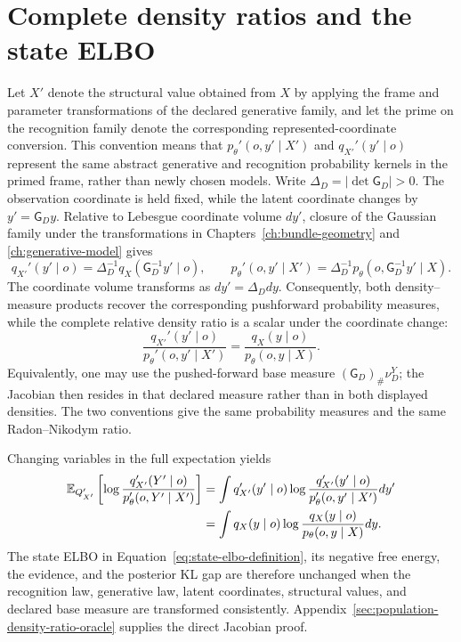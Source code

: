 \section{Complete density ratios and the state ELBO}

Let \(X'\) denote the structural value obtained from \(X\) by applying the frame and parameter transformations of the declared generative family, and let the prime on the recognition family denote the corresponding represented-coordinate conversion. This convention means that \(p_\theta'(o,y'\mid X')\) and \(q_{X'}'(y'\mid o)\) represent the same abstract generative and recognition probability kernels in the primed frame, rather than newly chosen models. Write \(\Delta_D=|\det\mathsf G_D|>0\). The observation coordinate is held fixed, while the latent coordinate changes by \(y'=\mathsf G_Dy\). Relative to Lebesgue coordinate volume \(dy'\), closure of the Gaussian family under the transformations in Chapters~\ref{ch:bundle-geometry} and \ref{ch:generative-model} gives
\begin{equation}
q_{X'}'(y'\mid o)
=\Delta_D^{-1}q_X(\mathsf G_D^{-1}y'\mid o),
\qquad
p_\theta'(o,y'\mid X')
=\Delta_D^{-1}p_\theta(o,\mathsf G_D^{-1}y'\mid X).
\label{eq:population-density-pushforward-laws}
\end{equation}
The coordinate volume transforms as \(dy'=\Delta_Ddy\). Consequently, both density--measure products recover the corresponding pushforward probability measures, while the complete relative density ratio is a scalar under the coordinate change:
\begin{equation}
\frac{q_{X'}'(y'\mid o)}{p_\theta'(o,y'\mid X')}
=\frac{q_X(y\mid o)}{p_\theta(o,y\mid X)}.
\label{eq:complete-density-ratio-gauge-invariance}
\end{equation}
Equivalently, one may use the pushed-forward base measure \((\mathsf G_D)_\#\nu_D^Y\); the Jacobian then resides in that declared measure rather than in both displayed densities. The two conventions give the same probability measures and the same Radon--Nikodym ratio.

Changing variables in the full expectation yields
\begin{align}
\mathbb E_{Q_{X'}'}\left[
\log\frac{q_{X'}'(Y'\mid o)}{p_\theta'(o,Y'\mid X')}
\right]
&=\int q_{X'}'(y'\mid o)
\log\frac{q_{X'}'(y'\mid o)}{p_\theta'(o,y'\mid X')}dy'
\notag\\
&=\int q_X(y\mid o)
\log\frac{q_X(y\mid o)}{p_\theta(o,y\mid X)}dy.
\label{eq:complete-free-energy-gauge-invariance}
\end{align}
The state ELBO in Equation~\eqref{eq:state-elbo-definition}, its negative free energy, the evidence, and the posterior KL gap are therefore unchanged when the recognition law, generative law, latent coordinates, structural values, and declared base measure are transformed consistently. Appendix~\ref{sec:population-density-ratio-oracle} supplies the direct Jacobian proof.

